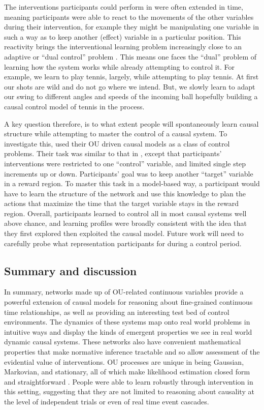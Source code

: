 \documentclass{cambridge7A}%
\begin{document}
The interventions participants could perform in \cite{davis2018control} were often extended in time, meaning participants were able to react to the movements of the other variables during their intervention, for example they might be manipulating one variable in such a way as to keep another (effect) variable in a particular position.  
This reactivity brings the interventional learning problem increasingly close to an adaptive or ``dual control'' problem \citep{feldbaum1961dual,guez2015phd,klenske2016dual,schulz2017control}. This means one faces the ``dual'' problem of learning how the system works while already attempting to control it. For example, we learn to play tennis, largely, while attempting to play tennis. At first our shots are wild and do not go where we intend. But, we slowly learn to adapt our swing to different angles and speeds of the incoming ball hopefully building a causal control model of tennis in the process.

A key question therefore, is to what extent people will spontaneously learn causal structure while attempting to master the control of a causal system.  To investigate this, \cite{davis2018control} used their OU driven causal models as a class of control problems.   Their task was similar to that in \cite{davis2018ctcv}, except that participants' interventions were restricted to one ``control'' variable, and limited single step increments up or down.  Participants' goal was to keep another ``target'' variable in a reward region.  To master this task in a model-based way, a participant would have to learn the structure of the network and use this knowledge to plan the actions that maximize the time that the target variable stays in the reward region.  
Overall, participants learned to control all in most causal systems well above chance, and learning profiles were broadly consistent with the idea that they first explored then exploited the causal model.  Future work will need to carefully probe what representation participants for during a control period.


\subsection{Summary and discussion}

In summary, networks made up of OU-related continuous variables provide a powerful extension of causal models for reasoning about fine-grained continuous time relationships, as well as providing an interesting test bed of control environments.  The dynamics of these systems map onto real world problems in intuitive ways and display the kinds of emergent properties we see in real world dynamic causal systems.  These networks also have convenient mathematical properties that make normative inference tractable and so allow assessment of the evidential value of interventions.  OU processes are unique in being Gaussian, Markovian, and stationary, all of which make likelihood estimation closed form and straightforward \citep{uhlenbeck1930theory}.  
People were able to learn robustly through intervention in this setting, suggesting that they are not limited to reasoning about causality at the level of independent trials or even of real time event cascades.
\end{document}
